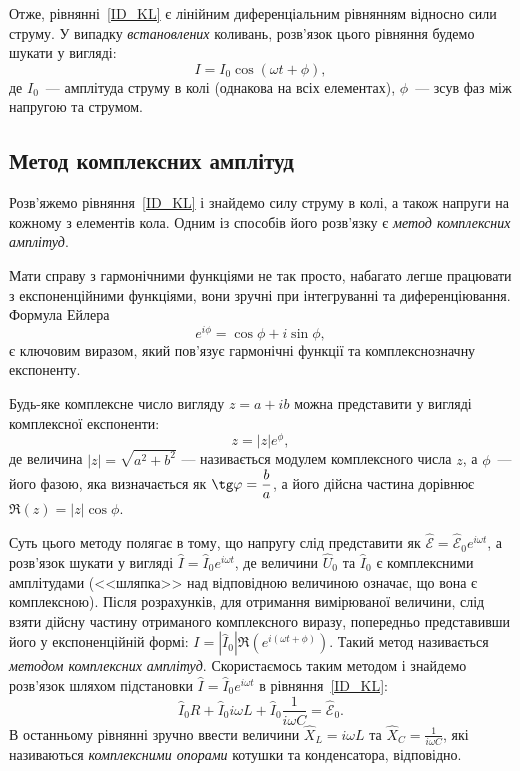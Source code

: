 Отже, рівнянні~\eqref{ID_KL} є лінійним диференціальним рівнянням відносно сили струму. У випадку \emph{встановлених} коливань, розв'язок цього рівняння будемо шукати у вигляді:
\begin{equation}\label{I}
	I = I_0\cos(\omega t + \phi),
\end{equation}
де $I_0$~--- амплітуда струму в колі (однакова на всіх елементах), $\phi$~--- зсув фаз між напругою та струмом.


\subsection{Метод комплексних амплітуд}

Розв'яжемо рівняння~\eqref{ID_KL} і знайдемо силу струму в колі, а також напруги на кожному з елементів кола. Одним із способів його розв'язку є \emph{метод комплексних амплітуд}.

\noindent\bigskip%
\begin{More}
	Мати справу з гармонічними функціями не так просто, набагато легше працювати з експоненційними функціями, вони зручні при інтегруванні та диференціювання. Формула Ейлера
	\begin{equation*}
		e^{i\phi} = \cos\phi + i\sin\phi,
	\end{equation*}
	є ключовим виразом, який пов'язує гармонічні функції та комплекснозначну експоненту.

	Будь-яке комплексне число вигляду $z = a + ib$ можна представити у вигляді комплексної експоненти:
	\[
		z = |z|e^{\phi},
	\]
	де величина $|z| = \sqrt{a^2 + b^2}$ --- називається модулем комплексного числа $z$, а $\phi$~--- його фазою, яка визначається як $\tg\phi = \dfrac{b}{a}$, а його дійсна частина дорівнює $\Re{(z)} =|z|\cos\phi$.
\end{More}


Суть цього методу полягає в тому, що напругу слід представити як $\hat{\mathcal{E}} = \hat{\mathcal{E}}_0e^{i\omega t}$, а розв'язок шукати у вигляді $\hat{I} = \hat{I}_0e^{i\omega t}$, де величини $\hat{U}_0$  та $\hat{I}_0$ є комплексними амплітудами (<<шляпка>> над відповідною величиною означає, що вона є комплексною). Після розрахунків, для отримання вимірюваної величини, слід взяти дійсну частину отриманого комплексного виразу, попередньо представивши його у експоненційній формі: $I = |\hat{I}_0| \Re(e^{i(\omega t + \phi)})$. Такий метод називається \emph{методом комплексних амплітуд}. Скористаємось таким методом  і знайдемо розв'язок  шляхом підстановки $\hat{I} = \hat{I}_0e^{i\omega t}$ в рівняння~\eqref{ID_KL}:
\begin{equation}\label{Complex_Amplitudes}
	\hat{I}_0 R  + \hat{I}_0 i\omega L + \hat{I}_0 \frac{1}{i\omega C} = \hat{\mathcal{E}}_0.
\end{equation}
В останньому рівнянні зручно ввести величини $\hat{X}_L = i\omega L$ та $\hat{X}_C = \frac{1}{i\omega C}$, які називаються \emph{комплексними опорами} котушки та конденсатора, відповідно.

